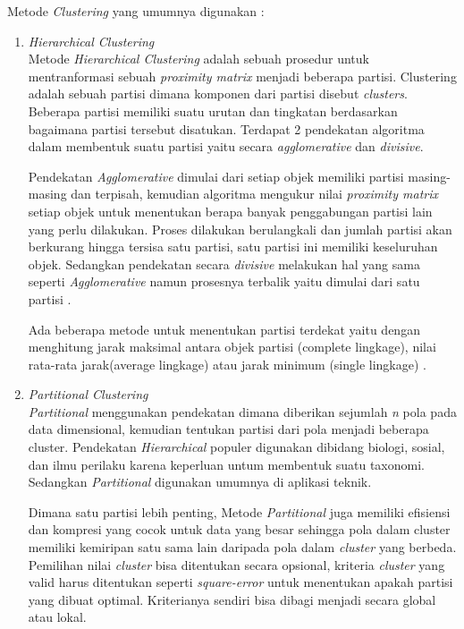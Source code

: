 Metode \textit{Clustering} yang umumnya digunakan \cite{2C9}:
\begin{enumerate}[leftmargin=1.3cm]
	\item \textit{Hierarchical Clustering} \\
	Metode \textit{Hierarchical Clustering} adalah sebuah prosedur untuk mentranformasi sebuah \textit{proximity matrix} menjadi beberapa partisi. Clustering adalah sebuah partisi dimana komponen dari partisi disebut \textit{clusters}. Beberapa partisi memiliki suatu urutan dan tingkatan berdasarkan bagaimana partisi tersebut disatukan. Terdapat 2 pendekatan algoritma dalam membentuk suatu partisi yaitu secara \textit{agglomerative} dan \textit{divisive}.\cite{2C9} 

	Pendekatan \textit{Agglomerative} dimulai dari setiap objek memiliki partisi masing-masing dan terpisah, kemudian algoritma mengukur nilai \textit{proximity matrix} setiap objek untuk menentukan berapa banyak penggabungan partisi lain yang perlu dilakukan. Proses dilakukan berulangkali dan jumlah partisi akan berkurang hingga tersisa satu partisi, satu partisi ini memiliki keseluruhan objek. Sedangkan pendekatan secara \textit{divisive} melakukan hal yang sama seperti \textit{Agglomerative} namun prosesnya terbalik yaitu dimulai dari satu partisi \cite{2C9}.

	Ada beberapa metode untuk menentukan partisi terdekat yaitu dengan menghitung jarak maksimal antara objek partisi (complete lingkage), nilai rata-rata jarak(average lingkage) atau jarak minimum (single lingkage) \cite{3D3}. 
	\item \textit{Partitional Clustering} \\
	\textit{Partitional} menggunakan pendekatan dimana diberikan sejumlah \textit{n} pola pada data dimensional, kemudian tentukan partisi dari pola menjadi beberapa cluster. Pendekatan \textit{Hierarchical} populer digunakan dibidang biologi, sosial, dan ilmu perilaku karena keperluan untum membentuk suatu taxonomi. Sedangkan \textit{Partitional} digunakan umumnya di aplikasi teknik. 
	
	Dimana satu partisi lebih penting, Metode \textit{Partitional} juga memiliki efisiensi dan kompresi yang cocok untuk data yang besar sehingga pola dalam cluster memiliki kemiripan satu sama lain daripada pola dalam \textit{cluster} yang berbeda. Pemilihan nilai \textit{cluster} bisa ditentukan secara opsional, kriteria \textit{cluster} yang valid harus ditentukan seperti \textit{square-error} untuk menentukan apakah partisi yang dibuat optimal. Kriterianya sendiri bisa dibagi menjadi secara global atau lokal.  

\end{enumerate}	
